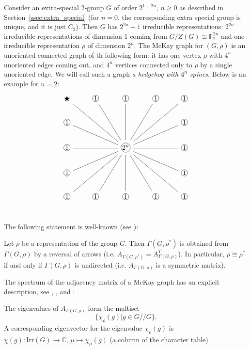 \documentclass[ALCO]{cedram}
\newcommand{\C}{{\mathbb C}}
\newcommand*\circled[1]{\tikz[baseline=(char.base)]{
            \node[shape=circle,draw,inner sep=0.5pt] (char) {#1};}}
\begin{document}
\begin{exam}\label{ex:extra_special}
Consider an extra-special $2$-group $G$ of order $2^{1+2n}$, $n\geq 0$ as 
described in Section~\ref{ssec:extra_special} (for $n=0$, the corresponding extra special group is unique, and it is just $C_2$). Then $G$ has $2^{2n}+1$ 
irreducible representations: $2^{2n}$ irreducible representations of dimension 
$1$ coming from $G/Z(G) \cong \mathbb{F}_2^{2n}$ and one irreducible representation 
$\rho$ of dimension $2^n$. The McKay graph for $(G, \rho)$ is an unoriented 
connected graph of th following form: it has one vertex $\rho$ with ${4}^n$ 
unoriented edges coming out, and ${4}^n$ vertices connected only to $\rho$ by a 
single unoriented edge. {We will call such a graph {\it a hedgehog with $4^n$ spines}.} Below is an example for $n=2$: 
$$
\begin{tikzcd}[arrows=-]
    \bigstar& \circled{1}& \circled{1}& \circled{1}& \circled{1}\\
   \circled{1} &&&& \circled{1} \\ 
\circled{1} & & \circled{\normalsize $2^n$} \arrow[rr]\arrow[rru]\arrow[rruu]\arrow[ruu]\arrow[uu]\arrow[ll]
\arrow[llu]\arrow[lluu]\arrow[luu]\arrow[rrd]\arrow[rrdd]\arrow[rdd]\arrow[dd]
\arrow[lld]\arrow[lldd]\arrow[ldd]&& \circled{1} \\
     \circled{1} &&&& \circled{1} \\
     \circled{1}& \circled{1}& \circled{1}& \circled{1}& \circled{1}\\
\end{tikzcd}
$$
\end{exam}

The following statement is well-known (see \cite[Proposition 2]{McKay}):
\begin{lemma}\label{lem:undirected}
 Let $\rho$ be a representation of the group $G$. Then $\Gamma(G, \rho^*)$ is 
obtained from $\Gamma(G, \rho)$ by a reversal of arrows (i.e. $A_{\Gamma(G, 
\rho^*)} = A_{\Gamma(G, \rho)}^T$). In particular, $\rho\cong \rho^*$ if and 
only if $\Gamma(G, \rho)$ is undirected (i.e. $A_{\Gamma(G, \rho)}$ is a 
symmetric matrix).
\end{lemma}


The spectrum of the adjacency matrix of a McKay graph has an explicit description, see 
\cite[Proposition 6]{McKay}, \cite[Proposition 2.3]{Browne}, and 
\cite{Steinberg}:

\begin{prop}\label{prop:spectra_adj_matrix}
 The eigenvalues of $A_{\Gamma(G, \rho)}$ form the multiset $$\{\chi_{\rho}(g) |g\in G//G\}.$$ A corresponding eigenvector for the 
eigenvalue $\chi_{\rho}(g) $ is $\chi(g):\mathrm{Irr}(G) \to \C, \, \mu \mapsto 
\chi_{\mu}(g)$ (a column of the character table).
\end{prop}
\end{document}
